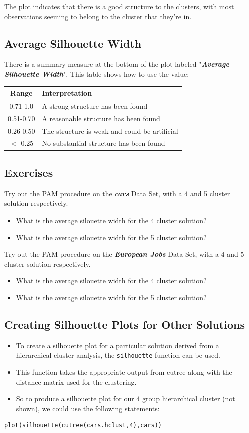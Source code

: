 \documentclass[12pt]{article}
\begin{document}
The plot indicates that there is a good structure to the clusters, with most observations seeming to belong to the cluster that they're in. 

\subsection*{Average Silhouette Width}
There is a summary measure at the bottom of the plot labeled "\textbf{\textit{Average Silhouette Width}}". This table shows how to use the value:
\bigskip

\begin{tabular}{|c|l|}
\hline
Range 	& Interpretation \\ \hline \hline
0.71-1.0 &	A strong structure has been found \\ \hline
0.51-0.70&  	A reasonable structure has been found \\ \hline
0.26-0.50&	The structure is weak and could be artificial \\ \hline
$<$ 0.25&	No substantial structure has been found \\ \hline
\end{tabular} 
\subsection*{Exercises}
Try out the PAM procedure on the \textbf{\textit{cars}} Data Set, with a 4 and 5 cluster solution respectively.
\begin{itemize}
\item What is the average silouette width for the 4 cluster solution?
\item What is the average silouette width for the 5 cluster solution?
\end{itemize}
Try out the PAM procedure on the \textbf{\textit{European Jobs}} Data Set, with a 4 and 5 cluster solution respectively.
\begin{itemize}
\item What is the average silouette width for the 4 cluster solution?
\item What is the average silouette width for the 5 cluster solution?
\end{itemize}
\newpage
\subsection*{Creating Silhouette Plots for Other Solutions}
\begin{itemize}
\item To create a silhouette plot for a particular solution derived from a hierarchical cluster analysis, the \texttt{silhouette} function can be used. 
\item This function takes the appropriate output from cutree along with the distance matrix used for the clustering. 
\item So to produce a silhouette plot for our 4 group hierarchical cluster (not shown), we could use the following statements:
\end{itemize}
\begin{framed}
\begin{verbatim}
plot(silhouette(cutree(cars.hclust,4),cars))
\end{verbatim}
\end{framed}
\end{document}
